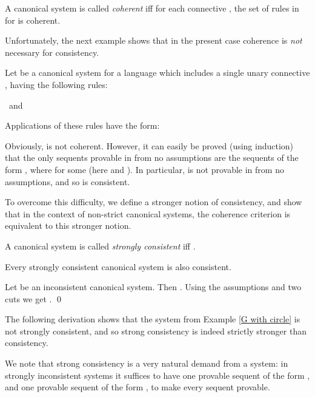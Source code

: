 \documentclass{LMCS}
\theoremstyle{remark}
\newcommand{\ms}{\medskip}
\begin{document}
\begin{defi}
\label{coherence}
A canonical system  
is called {\em coherent} iff for each connective , the 
set of rules in  for  is coherent.
\end{defi}

Unfortunately, the next example shows that
in the present case coherence is {\em not}  necessary for consistency.

\begin{exa}
\label{G with circle}
Let  be a canonical system for a language which includes
 a single unary connective , having
the following rules:
\begin{center}

\ and \

\end{center}
Applications of these rules have the form:

Obviously,  is not coherent.
However, 
it can easily be proved (using induction) that the only sequents
provable in  from no assumptions
are the sequents of the form , where  for some 
(here  and ).
In particular,  is not provable in  from no assumptions, and so  is consistent.
\end{exa}


\ms
To overcome this difficulty, we define a stronger notion of consistency,
and show that in the context of non-strict canonical systems,
the coherence criterion is equivalent to this stronger notion.

\begin{defi}
\label{strong consistency}
A canonical system  is called {\em strongly consistent} 
iff .
\end{defi}

\begin{prop}
\label{strong consistency -> consistency}
Every strongly consistent canonical system is also consistent.
\end{prop}
\proof
Let  be an inconsistent canonical system.
Then . 
Using the assumptions  and two cuts we get
.
\qed

\medskip\noindent
The following derivation shows that the system from Example \ref{G with circle}
is not strongly consistent, and so strong consistency is indeed 
strictly stronger than consistency.



\noindent We note that strong consistency is a very natural demand
from a system: in strongly inconsistent systems it suffices to have
one provable sequent of the form , and one provable sequent
of the form , to make every sequent provable.
\end{document}

